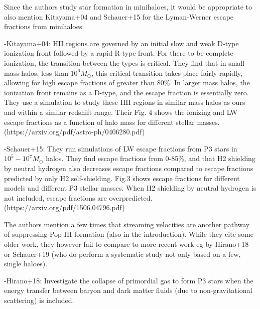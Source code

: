 \documentclass[11pt]{article}
\begin{document}
\begin{referee}
Since the authors study star formation in minihaloes, it would be appropriate to
 also mention Kitayama+04 and Schauer+15 for the Lyman-Werner escape fractions 
 from minihaloes.
\end{referee}
-Kitayama+04: HII regions are governed by an initial slow and weak D-type ionization front followed by a rapid R-type front. For there to be complete ionization, the transition between the types is critical. They find that in small mass halos, less than $10^6 M_{\odot}$, this critical transition takes place fairly rapidly, allowing for high escape fractions of greater than 80\%. In larger mass halos, the ionization front remains as a D-type, and the escape fraction is essentially zero. They use a simulation to study these HII regions in similar mass halos as ours and within a similar redshift range. Their Fig. 4 shows the ionizing and LW escape fractions as a function of halo mass for different stellar masses. (https://arxiv.org/pdf/astro-ph/0406280.pdf)

-Schauer+15: They run simulations of LW escape fractions from P3 stars in $10^5 - 10^7 M_{\odot}$ halos. They find escape fractions from 0-85\%, and that H2 shielding by neutral hydrogen also decreases escape fractions compared to escape fractions predicted by only H2 self-shielding. Fig.3 shows escape fractions for different models and different P3 stellar masses. When H2 shielding by neutral hydrogen is not included, escape fractions are overpredicted. (https://arxiv.org/pdf/1506.04796.pdf)

\begin{referee}
The authors mention a few times that streaming velocities are another pathway of
 suppressing Pop III formation (also in the introduction). While they cite some 
 older work, they however fail to compare to more recent work eg by Hirano+18 or
  Schauer+19 (who do perform a systematic study not only based on a few, single 
  haloes).
\end{referee}
-Hirano+18: Investigate the collapse of primordial gas to form P3 stars when the energy transfer between baryon and dark matter fluids (due to non-gravitational scattering) is included.
\end{document}
